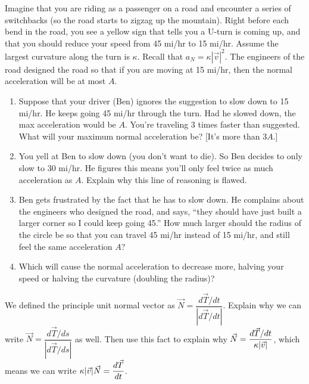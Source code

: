 \begin{problem}
 Imagine that you are riding as a passenger on a road and encounter a series of switchbacks (so the road starts to zigzag up the mountain). Right before each bend in the road, you see a yellow sign that tells you a U-turn is coming up, and that you should reduce your speed from 45 mi/hr to 15 mi/hr.  Assume the largest curvature along the turn is $\kappa$. Recall that $a_N=\kappa |\vec v|^2$. The engineers of the road designed the road so that if you are moving at 15 mi/hr, then the normal acceleration will be at most $A$. 
\begin{enumerate}
 \item Suppose that your driver (Ben) ignores the suggestion to slow down to 15 mi/hr.  He keeps going 45 mi/hr through the turn. Had he slowed down, the max acceleration would be $A$.  You're traveling 3 times faster than suggested.  What will your maximum normal acceleration be? [It's more than $3A$.]
 \item You yell at Ben to slow down (you don't want to die). So Ben decides to only slow to 30 mi/hr. He figures this means you'll only feel twice as much acceleration as $A$.  Explain why this line of reasoning is flawed.
 \item Ben gets frustrated by the fact that he has to slow down. He complains about the engineers who designed the road, and says, ``they should have just built a larger corner so I could keep going 45.''  How much larger should the radius of the circle be so that you can travel 45 mi/hr instead of 15 mi/hr, and still feel the same acceleration $A$?
 \item Which will cause the normal acceleration to decrease more, halving your speed or halving the curvature (doubling the radius)?
\end{enumerate}
\end{problem}

\begin{problem}
 We defined the principle unit normal vector as $\vec N = \dfrac{d\vec T/dt}{|d\vec T/dt|}$.  Explain why we can write $\vec N = \dfrac{d\vec T/ds}{|d\vec T/ds|}$ as well. Then use this fact to explain why $\displaystyle\vec N=\frac{d\vec T/dt}{\kappa|\vec v|}$, which means we can write $\displaystyle\kappa|\vec v|\vec N=\frac{d\vec T}{dt}$.  
\end{problem}


